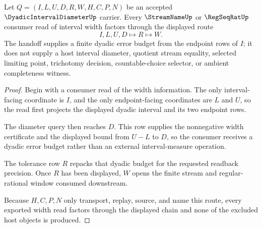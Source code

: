 \begin{theorem}
\label{thm:dyadic-interval-diameter-width-handoff}
Let $Q=(I,L,U,D,R,W,H,C,P,N)$ be an accepted $\DyadicIntervalDiameterUp$ carrier. Every $\StreamNameUp$ or $\RegSeqRatUp$ consumer read of interval width factors through the displayed route
$$
I,L,U,D \longmapsto R \longmapsto W .
$$
The handoff supplies a finite dyadic error budget from the endpoint rows of $I$; it does not supply a host interval diameter, quotient stream equality, selected limiting point, trichotomy decision, countable-choice selector, or ambient completeness witness.
\end{theorem}
\begin{proof}
Begin with a consumer read of the width information. The only interval-facing coordinate is $I$, and the only endpoint-facing coordinates are $L$ and $U$, so the read first projects the displayed dyadic interval and its two endpoint rows.

The diameter query then reaches $D$. This row supplies the nonnegative width certificate and the displayed bound from $U-L$ to $D$, so the consumer receives a dyadic error budget rather than an external interval-measure operation.

The tolerance row $R$ repacks that dyadic budget for the requested readback precision. Once $R$ has been displayed, $W$ opens the finite stream and regular-rational window consumed downstream.

Because $H,C,P,N$ only transport, replay, source, and name this route, every exported width read factors through the displayed chain and none of the excluded host objects is produced.
\end{proof}

